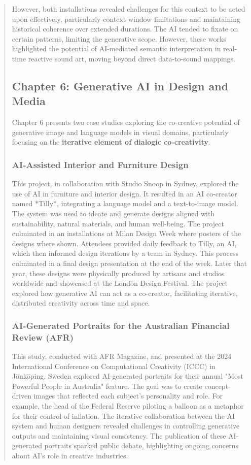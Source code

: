 \begin{quote}
However, both installations revealed challenges for this context to be acted upon effectively, particularly context window limitations and maintaining historical coherence over extended durations. The AI tended to fixate on certain patterns, limiting the generative scope. However, these works highlighted the potential of AI-mediated semantic interpretation in real-time reactive sound art, moving beyond direct data-to-sound mappings.

\subsection*{Chapter 6: Generative AI in Design and Media}

Chapter 6 presents two case studies exploring the co-creative potential of generative image and language models in visual domains, particularly focusing on the \textbf{iterative element of dialogic co-creativity}. 

\subsubsection*{AI-Assisted Interior and Furniture Design}

This project, in collaboration with Studio Snoop in Sydney, explored the use of AI in furniture and interior design. It resulted in an AI co-creator named *Tilly*, integrating a language model and a text-to-image model. The system was used to ideate and generate designs aligned with sustainability, natural materials, and human well-being. The project culminated in an installations at Milan Design Week where posters of the designs where shown. Attendees provided daily feedback to Tilly, an AI, which then informed design iterations by a team in Sydney.  This process culminated in a final design presentation at the end of the week.  Later that year, these designs were physically produced by artisans and studios worldwide and showcased at the London Design Festival. The project explored how generative AI can act as a co-creator, facilitating iterative, distributed creativity across time and space.

\subsubsection*{AI-Generated Portraits for the Australian Financial Review (AFR)}

This study, conducted with AFR Magazine, and presented at the 2024 International Conference on Computational Creativity (ICCC) in Jönköping, Sweden explored AI-generated portraits for their annual "Most Powerful People in Australia" feature. The goal was to create concept-driven images that reflected each subject’s personality and role. For example, the head of the Federal Reserve piloting a balloon as a metaphor for their control of inflation. The iterative collaboration between the AI system and human designers revealed challenges in controlling generative outputs and maintaining visual consistency. The publication of these AI-generated portraits sparked public debate, highlighting ongoing concerns about AI's role in creative industries.


\end{quote}

